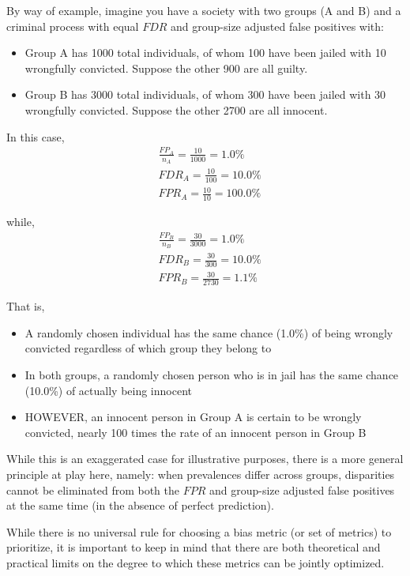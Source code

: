 \documentclass[]{krantz}
\begin{document}
By way of example, imagine you have a society with two groups (A and B)
and a criminal process with equal \(FDR\) and group-size adjusted false
positives with:

\begin{itemize}
\item
  Group A has 1000 total individuals, of whom 100 have been jailed with
  10 wrongfully convicted. Suppose the other 900 are all guilty.
\item
  Group B has 3000 total individuals, of whom 300 have been jailed with
  30 wrongfully convicted. Suppose the other 2700 are all innocent.
\end{itemize}

In this case, \[\begin{aligned}
&\frac{FP_A}{n_A} = \frac{10}{1000} = 1.0\% \\
&FDR_A = \frac{10}{100} = 10.0\% \\
&FPR_A = \frac{10}{10} = 100.0\%\end{aligned}\]

while, \[\begin{aligned}
&\frac{FP_B}{n_B} = \frac{30}{3000} = 1.0\% \\
&FDR_B = \frac{30}{300} = 10.0\% \\
&FPR_B = \frac{30}{2730} = 1.1\%\end{aligned}\]

That is,

\begin{itemize}
\item
  A randomly chosen individual has the same chance (1.0\%) of being
  wrongly convicted regardless of which group they belong to
\item
  In both groups, a randomly chosen person who is in jail has the same
  chance (10.0\%) of actually being innocent
\item
  HOWEVER, an innocent person in Group A is certain to be wrongly
  convicted, nearly 100 times the rate of an innocent person in Group B
\end{itemize}

While this is an exaggerated case for illustrative purposes, there is a
more general principle at play here, namely: when prevalences differ
across groups, disparities cannot be eliminated from both the \(FPR\)
and group-size adjusted false positives at the same time (in the absence
of perfect prediction).

While there is no universal rule for choosing a bias metric (or set of
metrics) to prioritize, it is important to keep in mind that there are
both theoretical and practical limits on the degree to which these
metrics can be jointly optimized.
\end{document}
